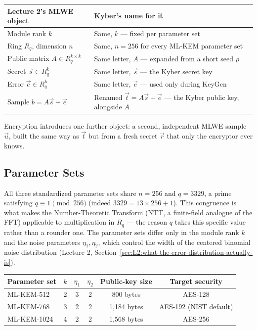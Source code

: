 \begin{center}
\renewcommand{\arraystretch}{1.25}
\begin{tabular}{|l|l|}
\hline
\textbf{Lecture 2's MLWE object} & \textbf{Kyber's name for it} \\
\hline
Module rank $k$ & Same, $k$ --- fixed per parameter set \\
Ring $R_q$, dimension $n$ & Same, $n=256$ for every ML-KEM parameter set \\
Public matrix $A \in R_q^{k\times k}$ & Same letter, $A$ --- expanded from a short seed $\rho$ \\
Secret $\vec s \in R_q^k$ & Same letter, $\vec s$ --- the Kyber secret key \\
Error $\vec e \in R_q^k$ & Same letter, $\vec e$ --- used only during KeyGen \\
Sample $b = A\vec s + \vec e$ & Renamed $\vec t = A\vec s+\vec e$ --- the Kyber public key, alongside $A$ \\
\hline
\end{tabular}
\end{center}

Encryption introduces one further object: a second, independent MLWE sample $\vec u$, built the same way as $\vec t$ but from a fresh secret $\vec r$ that only the encryptor ever knows.

\subsection{Parameter Sets}
\label{sec:L3:concrete-parameters}

All three standardized parameter sets share $n=256$ and $q=3329$, a prime satisfying $q \equiv 1 \pmod{256}$ (indeed $3329 = 13\times256+1$). This congruence is what makes the Number-Theoretic Transform (NTT, a finite-field analogue of the FFT) applicable to multiplication in $R_q$ --- the reason $q$ takes this specific value rather than a rounder one. The parameter sets differ only in the module rank $k$ and the noise parameters $\eta_1,\eta_2$, which control the width of the centered binomial noise distribution (Lecture 2, Section~\ref{sec:L2:what-the-error-distribution-actually-is}).

\begin{center}
\begin{tabular}{|l|c|c|c|c|c|}
\hline
\textbf{Parameter set} & $k$ & $\eta_1$ & $\eta_2$ & Public-key size & Target security \\
\hline
ML-KEM-512  & 2 & 3 & 2 & 800 bytes & AES-128 \\
ML-KEM-768  & 3 & 2 & 2 & 1{,}184 bytes & AES-192 (NIST default) \\
ML-KEM-1024 & 4 & 2 & 2 & 1{,}568 bytes & AES-256 \\
\hline
\end{tabular}
\end{center}

